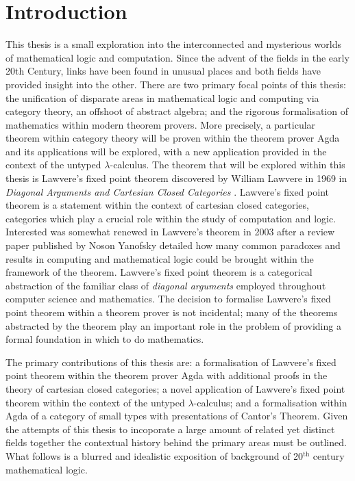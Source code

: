 
\section{Introduction}

This thesis is a small exploration into the interconnected and mysterious worlds
of mathematical logic and computation. Since the advent of the fields in the
early 20th Century, links have been found in unusual places and both fields have
provided insight into the other. There are two primary focal points of this
thesis: the unification of disparate areas in mathematical logic and computing
via category theory, an offshoot of abstract algebra; and the rigorous
formalisation of mathematics within modern theorem provers. More precisely, a
particular theorem within category theory will be proven within the theorem
prover Agda and its applications will be explored, with a new application
provided in the context of the untyped $\lambda$-calculus. The theorem that will
be explored within this thesis is Lawvere's fixed point theorem discovered by
William Lawvere in 1969 in \textit{Diagonal Arguments and Cartesian Closed
Categories} \cite{lawvere1969diagonal}. Lawvere's fixed point theorem is a
statement within the context of cartesian closed categories, categories which
play a crucial role within the study of computation and logic. Interested was
somewhat renewed in Lawvere's theorem in 2003 after a review paper published by
Noson Yanofsky \cite{yanofsky2003universal} detailed how many common paradoxes
and results in computing and mathematical logic could be brought within the
framework of the theorem. Lawvere's fixed point theorem is a categorical
abstraction of the familiar class of \textit{diagonal arguments} employed
throughout computer science and mathematics. The decision to formalise Lawvere's
fixed point theorem within a theorem prover is not incidental; many of the
theorems abstracted by the theorem play an important role in the problem of
providing a formal foundation in which to do mathematics.

The primary contributions of this thesis are: a formalisation of Lawvere's fixed
point theorem within the theorem prover Agda with additional proofs in the
theory of cartesian closed categories; a novel application of Lawvere's fixed
point theorem within the context of the untyped $\lambda$-calculus; and a
formalisation within Agda of a category of small types with presentations of
Cantor's Theorem. Given the attempts of this thesis to incoporate a large amount
of related yet distinct fields together the contextual history behind the
primary areas must be outlined. What follows is a blurred and idealistic
exposition of background of 20$^{\textrm{th}}$ century mathematical logic.

